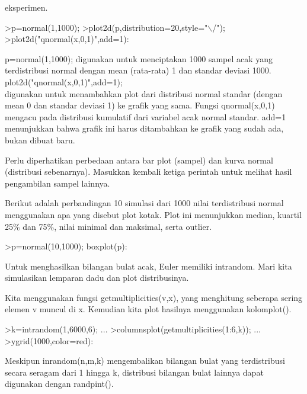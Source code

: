\documentclass{article}
\begin{document}
\begin{eulernotebook}
\begin{eulercomment}
\begin{eulercomment}
\begin{eulercomment}
eksperimen.
\end{eulercomment}
\begin{eulerprompt}
>p=normal(1,1000); 
>plot2d(p,distribution=20,style="\(\backslash\)/"); 
>plot2d("qnormal(x,0,1)",add=1): 
\end{eulerprompt}
\begin{eulercomment}
p=normal(1,1000); digunakan untuk menciptakan 1000 sampel acak yang
terdistribusi normal dengan mean (rata-rata) 1 dan standar deviasi
1000.\\
plot2d("qnormal(x,0,1)",add=1); \\
digunakan untuk menambahkan plot dari distribusi normal standar
(dengan mean 0 dan standar deviasi 1) ke grafik yang sama. Fungsi
qnormal(x,0,1) mengacu pada distribusi kumulatif dari variabel acak
normal standar. add=1 menunjukkan bahwa grafik ini harus ditambahkan
ke grafik yang sudah ada, bukan dibuat baru.

Perlu diperhatikan perbedaan antara bar plot (sampel) dan kurva normal
(distribusi sebenarnya). Masukkan kembali ketiga perintah untuk
melihat hasil pengambilan sampel lainnya.
\end{eulercomment}
\begin{eulercomment}
Berikut adalah perbandingan 10 simulasi dari 1000 nilai terdistribusi
normal menggunakan apa yang disebut plot kotak. Plot ini menunjukkan
median, kuartil 25\% dan 75\%, nilai minimal dan maksimal, serta
outlier.
\end{eulercomment}
\begin{eulerprompt}
>p=normal(10,1000); boxplot(p):
\end{eulerprompt}
\begin{eulercomment}
Untuk menghasilkan bilangan bulat acak, Euler memiliki intrandom. Mari
kita simulasikan lemparan dadu dan plot distribusinya.

Kita menggunakan fungsi getmultiplicities(v,x), yang menghitung
seberapa sering elemen v muncul di x. Kemudian kita plot hasilnya
menggunakan kolomplot().
\end{eulercomment}
\begin{eulerprompt}
>k=intrandom(1,6000,6);  ...
>columnsplot(getmultiplicities(1:6,k));  ...
>ygrid(1000,color=red):
\end{eulerprompt}
\begin{eulercomment}
Meskipun inrandom(n,m,k) mengembalikan bilangan bulat yang
terdistribusi secara seragam dari 1 hingga k, distribusi bilangan
bulat lainnya dapat digunakan dengan randpint().


\end{eulercomment}
\end{eulercomment}
\end{eulercomment}
\end{eulernotebook}
\end{document}
